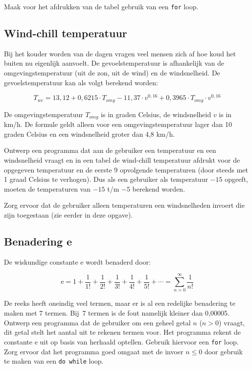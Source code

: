 \documentclass[a4paper,10pt,fleqn,twoside]{article}
\begin{document}
Maak voor het afdrukken van de tabel gebruik van een \lstinline|for| loop.

\subsection{Wind-chill temperatuur}
Bij het kouder worden van de dagen vragen veel mensen zich af hoe koud het buiten nu eigenlijk aanvoelt. De gevoelstemperatuur is afhankelijk van de omgevingstemperatuur (uit de zon, uit de wind) en de windsnelheid. De gevoelstemperatuur kan als volgt berekend worden:

\begin{equation*}
T_{wc}=13,12 + 0,6215\cdot T_{omg} - 11,37\cdot v^{0,16} + 0,3965\cdot T_{omg}\cdot v^{0,16}
\end{equation*}

De omgevingstemperatuur $T_{omg}$ is in graden Celsius, de windsnelheid $v$ is in km/h. De formule geldt alleen voor een omgevingstemperatuur lager dan 10 graden Celsius en een windsnelheid groter dan 4,8 km/h.

Ontwerp een programma dat aan de gebruiker een temperatuur en een windsnelheid vraagt en in een tabel de wind-chill temperatuur afdrukt voor de opgegeven temperatuur en de eerste 9 opvolgende temperaturen (door steeds met 1 graad Celsius te verhogen). Dus als een gebruiker als temperatuur $-15$ opgeeft, moeten de temperaturen van $-15$ t/m $-5$ berekend worden.

Zorg ervoor dat de gebruiker alleen temperaturen een windsnelheden invoert die zijn toegestaan (zie eerder in deze opgave).

\subsection{Benadering e}
De wiskundige constante e wordt benaderd door:

\begin{equation*}
\mathrm{e} = 1 + \dfrac{1}{1!} + \dfrac{1}{2!} + \dfrac{1}{3!} + \dfrac{1}{4!} + \dfrac{1}{5!} + \cdots = \sum_{n=0}^{\infty} \dfrac{1}{n!}
\end{equation*}

De reeks heeft oneindig veel termen, maar er is al een redelijke benadering te maken met 7 termen. Bij~7 termen is de fout namelijk kleiner dan 0,00005. Ontwerp een programma dat de gebruiker om een geheel getal $n$ ($n > 0$) vraagt, dit getal stelt het aantal uit te rekenen termen voor. Het programma rekent de constante e uit op basis van herhaald optellen. Gebruik hiervoor een \lstinline|for| loop. Zorg ervoor dat het programma goed omgaat met de invoer $n \leq 0$ door gebruik te maken van een \lstinline|do while| loop.
\end{document}
